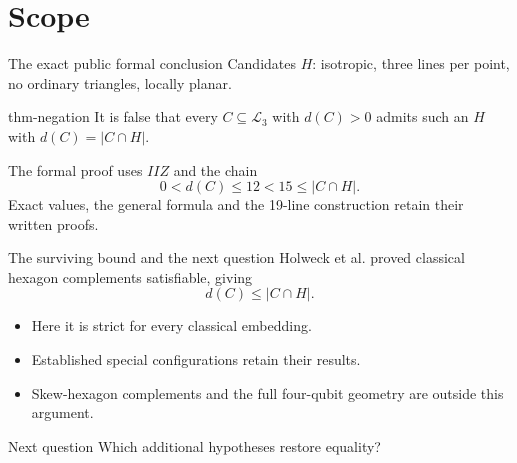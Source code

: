 \documentclass{beamer}
\begin{document}
\section{Scope}
\begin{frame}{The exact public formal conclusion}
Candidates $H$: isotropic, three lines per point, no ordinary triangles, locally planar.
\begin{bookresult}{thm-negation}
It is false that every $C\subseteq\mathcal L_3$ with $d(C)>0$ admits such an $H$ with $d(C)=|C\cap H|$.
\end{bookresult}
The formal proof uses $IIZ$ and the chain
\[0<d(C)\le12<15\le|C\cap H|.\]
Exact values, the general formula and the 19-line construction retain their written proofs.
\end{frame}
\begin{frame}{The surviving bound and the next question}
Holweck et al. proved classical hexagon complements satisfiable, giving
\[d(C)\le|C\cap H|.\]
\begin{itemize}
\item Here it is strict for every classical embedding.
\item Established special configurations retain their results.
\item Skew-hexagon complements and the full four-qubit geometry are outside this argument.
\end{itemize}
\begin{block}{Next question}
Which additional hypotheses restore equality?
\end{block}
\end{frame}
\appendix
\end{document}
